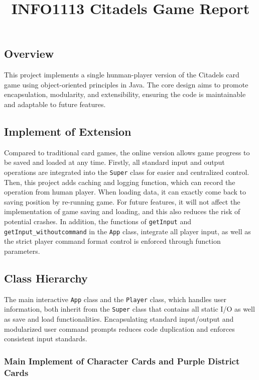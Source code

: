 \documentclass[12pt]{article}
\title{INFO1113 Citadels Game Report}
\date{}
\begin{document}
\maketitle

\subsection*{Overview}

This project implements a single hunman-player version of the Citadels card game using object-oriented principles in Java. The core design aims to promote encapsulation, modularity, and extensibility, ensuring the code is maintainable and adaptable to future features.

\subsection*{Implement of Extension}

Compared to traditional card games, the online version allows game progress to be saved and loaded at any time. Firstly, all standard input and output operations are integrated into the \texttt{Super} class for easier and centralized control. Then, this project adds caching and logging function, which can record the operation from human player. When loading data, it can exactly come back to saving position by re-running game. For future features, it will not affect the implementation of game saving and loading, and this also reduces the risk of potential crashes. In addition, the functions of \texttt{getInput} and \texttt{getInput\_withoutcommand} in the \texttt{App} class, integrate all player input, as well as the strict player command format control is enforced through function parameters.

\subsection*{Class Hierarchy}

The main interactive \texttt{App} class and the \texttt{Player} class, which handles user information, both inherit from the \texttt{Super} class that contains all static I/O as well as save and load functionalities. Encapsulating standard input/output and modularized user command prompts reduces code duplication and enforces consistent input standards.

\subsubsection*{Main Implement of Character Cards and Purple District Cards}
\end{document}
